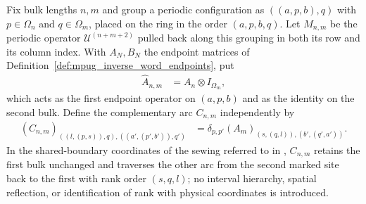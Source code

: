 \begin{definition}
    \label{def:mpug_inverse_periodic_grouping}
    \leanok
    Fix bulk lengths $n,m$ and group a periodic configuration as
    $((a,p,b),q)$ with $p\in\Omega_n$ and $q\in\Omega_m$, placed on the
    ring in the order $(a,p,b,q)$. Let $M_{n,m}$ be the periodic operator
    $\mathcal U^{(n+m+2)}$ pulled back along this grouping in both its row
    and its column index. With $A_N,B_N$ the endpoint matrices of
    Definition~\ref{def:mpug_inverse_word_endpoints}, put
    \begin{align}
        \widehat A_{n,m} & =A_n\otimes I_{\Omega_m},
    \end{align}
    which acts as the first endpoint operator on $(a,p,b)$ and as the
    identity on the second bulk. Define the complementary arc
    $C_{n,m}$ independently by
    \begin{align}
        (C_{n,m})_{((l,(p,s)),q),((a',(p',b')),q')}
         & =\delta_{p,p'}(A_m)_{(s,(q,l)),(b',(q',a'))}.
    \end{align}
    In the shared-boundary coordinates of the sewing referred to in
    \cite[lines~5486--5487]{FrancoRubio2025MPUGauging}, $C_{n,m}$ retains
    the first bulk unchanged and traverses the other arc from the second
    marked site back to the first with rank order $(s,q,l)$; no interval
    hierarchy, spatial reflection, or identification of rank with physical
    coordinates is introduced.
\end{definition}


